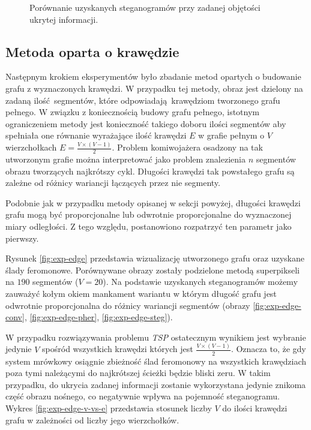 {{{\begin{figure}
                \caption[Porównanie rezultatów]
                {Porównanie uzyskanych steganogramów przy zadanej objętości ukrytej informacji.}
                \label{fig:exp-vertex-results}
            \end{figure}
        }

        \subsection{Metoda oparta o krawędzie}
        {
            Następnym krokiem eksperymentów było zbadanie metod opartych o budowanie grafu z wyznaczonych krawędzi. W
            przypadku tej metody, obraz jest dzielony na zadaną ilość segmentów, które odpowiadają krawędziom tworzonego
            grafu pełnego. W związku z koniecznością budowy grafu pełnego, istotnym ograniczeniem metody jest
            konieczność takiego doboru ilości segmentów aby spełniała one równanie wyrażające ilość krawędzi $E$ w
            grafie pełnym o $V$ wierzchołkach $E = \frac{V \times (V - 1)}{2}$. Problem komiwojażera osadzony na tak
            utworzonym grafie można interpretować jako problem znalezienia $n$ segmentów obrazu tworzących najkrótszy
            cykl. Długości krawędzi tak powstałego grafu są zależne od różnicy wariancji łączących przez nie segmenty.

            Podobnie jak w przypadku metody opisanej w sekcji powyżej, długości krawędzi grafu mogą być proporcjonalne
            lub odwrotnie proporcjonalne do wyznaczonej miary odległości. Z tego względu, postanowiono rozpatrzyć ten
            parametr jako pierwszy.

            Rysunek \ref{fig:exp-edge} przedstawia wizualizację utworzonego grafu oraz uzyskane ślady feromonowe.
            Porównywane obrazy zostały podzielone metodą superpikseli na $190$ segmentów ($V = 20$). Na podstawie
            uzyskanych steganogramów możemy zauważyć kołym okiem mankament wariantu w którym długość grafu jest
            odwrotnie proporcjonalna do różnicy wariancji segmentów (obrazy \ref{fig:exp-edge-conv},
            \ref{fig:exp-edge-pher}, \ref{fig:exp-edge-steg}).

            W przypadku rozwiązywania problemu \textit{TSP} ostatecznym wynikiem jest wybranie jedynie $V$ spośród
            wszystkich krawędzi których jest $\frac{V \times (V - 1)}{2}$. Oznacza to, że gdy system mrówkowy osiągnie
            zbieżność ślad feromonowy na wszystkich krawędziach poza tymi należącymi do najkrótszej ścieżki będzie
            bliski zeru. W takim przypadku, do ukrycia zadanej informacji zostanie wykorzystana jedynie znikoma część
            obrazu nośnego, co negatywnie wpływa na pojemność steganogramu. Wykres \ref{fig:exp-edge-v-vs-e} przedstawia
            stosunek liczby $V$ do ilości krawędzi grafu w zależności od liczby jego wierzchołków.

}}}
